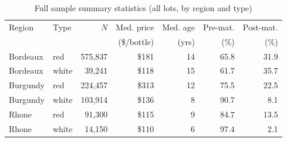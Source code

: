 \begin{table}[htbp]
\centering
\caption{Full sample summary statistics (all lots, by region and type)}
\label{tab:full_sample}
\small
\begin{threeparttable}
\begin{tabular}{llrrrrr}
\toprule
Region & Type & $N$ & Med. price & Med. age & Pre-mat. & Post-mat. \\
 & & & (\$/bottle) & (yrs) & (\%) & (\%) \\
\midrule
Bordeaux & red & 575,837 & \$181 & 14 & 65.8 & 31.9 \\
Bordeaux & white & 39,241 & \$118 & 15 & 61.7 & 35.7 \\
Burgundy & red & 224,457 & \$313 & 12 & 75.5 & 22.5 \\
Burgundy & white & 103,914 & \$136 & 8 & 90.7 & 8.1 \\
Rhone & red & 91,300 & \$115 & 9 & 84.7 & 13.5 \\
Rhone & white & 14,150 & \$110 & 6 & 97.4 & 2.1 \\
\bottomrule
\end{tabular}
\end{threeparttable}
\end{table}
